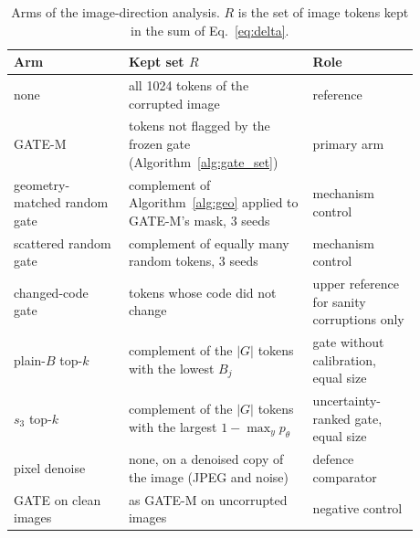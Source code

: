 \begin{table}[t]
\centering
\caption{Arms of the image-direction analysis. $R$ is the set of image tokens kept in the sum of Eq.~\eqref{eq:delta}.}
\label{tab:arms}
\small
\begin{tabular}{p{0.25\linewidth}p{0.4\linewidth}p{0.23\linewidth}}
\toprule
Arm & Kept set $R$ & Role \\
\midrule
none & all 1024 tokens of the corrupted image & reference \\
GATE-M & tokens not flagged by the frozen gate (Algorithm~\ref{alg:gate_set}) & primary arm \\
geometry-matched random gate & complement of Algorithm~\ref{alg:geo} applied to GATE-M's mask, 3 seeds & mechanism control \\
scattered random gate & complement of equally many random tokens, 3 seeds & mechanism control \\
changed-code gate & tokens whose code did not change & upper reference for sanity corruptions only \\
plain-$B$ top-$k$ & complement of the $|G|$ tokens with the lowest $B_j$ & gate without calibration, equal size \\
$s_3$ top-$k$ & complement of the $|G|$ tokens with the largest $1-\max_y p_\theta$ & uncertainty-ranked gate, equal size \\
pixel denoise & none, on a denoised copy of the image (JPEG and noise) & defence comparator \\
GATE on clean images & as GATE-M on uncorrupted images & negative control \\
\bottomrule
\end{tabular}
\end{table}

